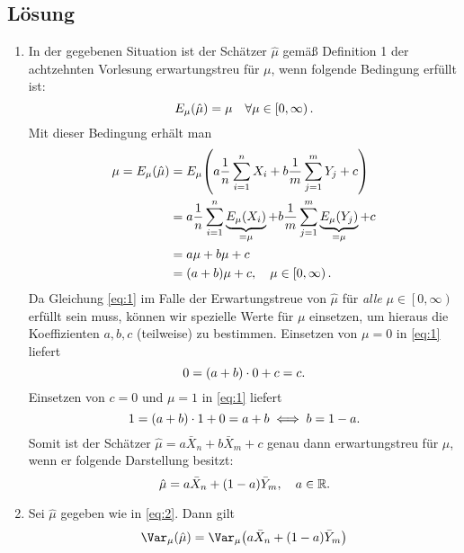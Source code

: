 \documentclass{exercise}
\begin{document}
    \subsection*{Lösung}
    \begin{enumerate}
        \item In der gegebenen Situation ist der Schätzer \(\hat{\mu}\) gemäß Definition 1 der achtzehnten Vorlesung erwartungstreu für \(\mu\), wenn folgende Bedingung erfüllt ist:
        \[
            E_\mu\parentheses*{\hat{\mu}} = \mu \quad \forall\mu \in \left[0, \infty\right).
        \]
        Mit dieser Bedingung erhält man
        \begin{align}
            \mu = E_\mu\parentheses*{\hat{\mu}} &= E_\mu\parentheses*{a\frac{1}{n}\sum_{i = 1}^n X_i + b\frac{1}{m}\sum_{j = 1}^m Y_j + c}\nonumber\\
            &= a\frac{1}{n}\sum_{i = 1}^n \underbrace{E_\mu\parentheses*{X_i}}_{= \mu} + b\frac{1}{m}\sum_{j = 1}^m \underbrace{E_\mu\parentheses*{Y_j}}_{= \mu} + c\nonumber\\
            &= a\mu + b\mu + c\nonumber\\
            &= \parentheses*{a + b}\mu + c, \quad \mu \in \left[0, \infty\right).\label{eq:1}
        \end{align}
        Da Gleichung \eqref{eq:1} im Falle der Erwartungstreue von \(\hat{\mu}\) für \emph{alle} \(\mu \in \left[0, \infty\right)\) erfüllt sein muss, können wir spezielle Werte für \(\mu\) einsetzen, um hieraus die Koeffizienten \(a, b, c\) (teilweise) zu bestimmen.
        Einsetzen von \(\mu = 0\) in \eqref{eq:1} liefert
        \[
            0 = \parentheses*{a + b} \cdot 0 + c = c.
        \]
        Einsetzen von \(c = 0\) und \(\mu = 1\) in \eqref{eq:1} liefert
        \[
            1 = \parentheses*{a + b} \cdot 1 + 0 = a + b \iff b = 1 - a.
        \]
        Somit ist der Schätzer \(\hat{\mu} = a\bar{X}_n + b\bar{X}_m + c\) genau dann erwartungstreu für \(\mu\), wenn er folgende Darstellung besitzt:
        \begin{equation}\label{eq:2}
            \hat{\mu} = a\bar{X}_n + \parentheses*{1 - a}\bar{Y}_m, \quad a \in \R.
        \end{equation}
        \item Sei \(\hat{\mu}\) gegeben wie in \eqref{eq:2}.
        Dann gilt
        \begin{align}
            \Var_\mu\parentheses*{\hat{\mu}} &= \Var_\mu\parentheses*{a\bar{X}_n + \parentheses*{1 - a}\bar{Y}_m}\nonumber\\

\end{align}
\end{enumerate}
\end{document}
